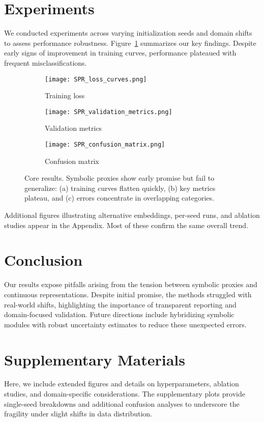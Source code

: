 \documentclass{article}
\begin{document}
\section{Experiments}
We conducted experiments across varying initialization seeds and domain shifts to assess performance robustness. Figure~\ref{fig:combined} summarizes our key findings. Despite early signs of improvement in training curves, performance plateaued with frequent misclassifications.

\begin{figure}[t!]
    \centering
    \begin{subfigure}[b]{0.31\textwidth}
        \texttt{[image: SPR\_loss\_curves.png]}
        \caption{Training loss}
    \end{subfigure}
    \hfill
    \begin{subfigure}[b]{0.31\textwidth}
        \texttt{[image: SPR\_validation\_metrics.png]}
        \caption{Validation metrics}
    \end{subfigure}
    \hfill
    \begin{subfigure}[b]{0.31\textwidth}
        \texttt{[image: SPR\_confusion\_matrix.png]}
        \caption{Confusion matrix}
    \end{subfigure}
    \caption{Core results. Symbolic proxies show early promise but fail to generalize: (a) training curves flatten quickly, (b) key metrics plateau, and (c) errors concentrate in overlapping categories.}
    \label{fig:combined}
\end{figure}

Additional figures illustrating alternative embeddings, per-seed runs, and ablation studies appear in the Appendix. Most of these confirm the same overall trend.

\section{Conclusion}
Our results expose pitfalls arising from the tension between symbolic proxies and continuous representations. Despite initial promise, the methods struggled with real-world shifts, highlighting the importance of transparent reporting and domain-focused validation. Future directions include hybridizing symbolic modules with robust uncertainty estimates to reduce these unexpected errors.

\clearpage


\appendix

\section{Supplementary Materials}
Here, we include extended figures and details on hyperparameters, ablation studies, and domain-specific considerations. The supplementary plots provide single-seed breakdowns and additional confusion analyses to underscore the fragility under slight shifts in data distribution.
\end{document}
